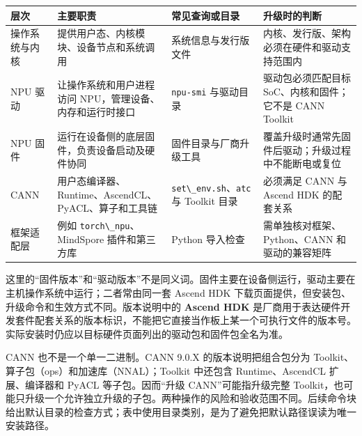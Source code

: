 \begin{longtable}[]{@{}
  >{\raggedright\arraybackslash}p{}
  >{\raggedright\arraybackslash}p{}
  >{\raggedright\arraybackslash}p{}
  >{\raggedright\arraybackslash}p{}@{}}
\toprule\noalign{}
\begin{minipage}[b]{\linewidth}\raggedright
层次
\end{minipage} & \begin{minipage}[b]{\linewidth}\raggedright
主要职责
\end{minipage} & \begin{minipage}[b]{\linewidth}\raggedright
常见查询或目录
\end{minipage} & \begin{minipage}[b]{\linewidth}\raggedright
升级时的判断
\end{minipage} \\
\midrule\noalign{}
\endhead
\bottomrule\noalign{}
\endlastfoot
操作系统与内核 & 提供用户态、内核模块、设备节点和系统调用 &
系统信息与发行版文件 & 内核、发行版、架构必须在硬件和驱动支持范围内 \\
NPU 驱动 & 让操作系统和用户进程访问 NPU，管理设备、内存和运行时接口 &
\passthrough{\lstinline!npu-smi!} 与驱动目录 & 驱动包必须匹配目标
SoC、内核和固件；它不是 CANN Toolkit \\
NPU 固件 & 运行在设备侧的底层固件，负责设备启动及硬件协同 &
固件目录与厂商升级工具 &
覆盖升级时通常先固件后驱动；升级过程中不能断电或复位 \\
CANN & 用户态编译器、Runtime、AscendCL、PyACL、算子和工具链 &
\passthrough{\lstinline!set\_env.sh!}、\passthrough{\lstinline!atc!} 与
Toolkit 目录 & 必须满足 CANN 与 Ascend HDK 的配套关系 \\
框架适配层 & 例如 \passthrough{\lstinline!torch\_npu!}、MindSpore
插件和第三方库 & Python 导入检查 & 需单独核对框架、Python、CANN
和驱动的兼容矩阵 \\
\end{longtable}

这里的``固件版本''和``驱动版本''不是同义词。固件主要在设备侧运行，驱动主要在主机操作系统中运行；二者常由同一套
Ascend HDK 下载页面提供，但安装包、升级命令和生效方式不同。版本说明中的
\textbf{Ascend HDK}
是厂商用于表达硬件开发套件配套关系的版本标识，不能把它直接当作板上某一个可执行文件的版本号。实际安装时仍应以目标硬件页面列出的驱动包和固件包全名为准。

CANN 也不是一个单一二进制。CANN 9.0.X 的版本说明把组合包分为
Toolkit、算子包（ops）和加速库（NNAL）；Toolkit 中还包含
Runtime、AscendCL 扩展、编译器和 PyACL 等子包。因而``升级
CANN''可能指升级完整
Toolkit，也可能只升级一个允许独立升级的子包。两种操作的风险和验收范围不同。后续命令块给出默认目录的检查方式；表中使用目录类别，是为了避免把默认路径误读为唯一安装路径。

